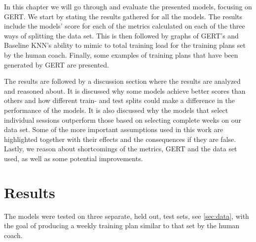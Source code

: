 In this chapter we will go through and evaluate the presented models, focusing on GERT.
We start by stating the results gathered for all the models.
The results include the models' score for each of the metrics calculated on each of the three ways of splitting the data set.
This is then followed by graphs of GERT's and Baseline KNN's ability to mimic to total training load for the training plans set by the human coach.
Finally, some examples of training plans that have been generated by GERT are presented.

The results are followed by a discussion section where the results are analyzed and reasoned about.
It is discussed why some models achieve better scores than others and how different train- and test splits could make a difference in the performance of the models.
It is also discussed why the models that select individual sessions outperform those based on selecting complete weeks on our data set.
Some of the more important assumptions used in this work are highlighted together with their effects and the consequences if they are false.
Lastly, we reason about shortcomings of the metrics, GERT and the data set used, as well as some potential improvements.


\section{Results}
The models were tested on three separate, held out, test sets, see \cref{sec:data}, with the goal of producing a weekly training plan similar to that set by the human coach.

